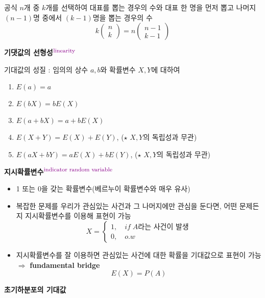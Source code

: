 \documentclass{oblivoir}
\newcommand{\DC}[1]{\textcolor{DarkMagenta}{#1}}%
\newcommand{\UP}[1]{$^{\mbox{\DC{\footnotesize #1}}}$}
\newcommand{\mat}[2]{\begin{pmatrix} #1 \\ #2 \end{pmatrix}}
\begin{document}
\begin{myframe}{공식}
$n$개 중 $k$개를 선택하여 대표를 뽑는 경우의 수와 대표 한 명을 먼저 뽑고 나머지 $(n-1)$명 중에서 $(k-1)$명을 뽑는 경우의 수
$$
k \mat{n}{k} = n \mat{n-1}{k-1}
$$
\end{myframe}
\textbf{기댓값의 선형성}\UP{linearity}

기대값의 성질 : 임의의 상수 $a, b$와 확률변수 $X, Y$에 대하여
\begin{enumerate}
\item $E(a) = a$
\item $E(bX) = bE(X)$
\item $E(a+bX) = a + bE(X)$
\item $E(X + Y) = E(X) + E(Y)$, ($\star$ $X,Y$의 독립성과 무관) 
\item $E(aX + bY) = aE(X) + bE(Y)$, ($\star$ $X,Y$의 독립성과 무관)
\end{enumerate}
\textbf{지시확률변수}\UP{indicator random variable}
\begin{itemize}
\item 1 또는 0을 갖는 확률변수(베르누이 확률변수와 매우 유사)
\item 복잡한 문제를 우리가 관심있는 사건과 그 나머지에만 관심을 둔다면, 어떤 문제든지 지시확률변수를 이용해 표현이 가능
$$
X = 
\begin{cases}
1, \quad if \; A\mbox{라는 사건이 발생}\\
0, \quad o.w
\end{cases}
$$
\item 지시확률변수를 잘 이용하면 관심있는 사건에 대한 확률을 기대값으로 표현이 가능 $\Rightarrow$ \textbf{fundamental bridge}
$$
E(X) = P(A)
$$
\end{itemize}
\textbf{초기하분포의 기대값}
\end{document}
